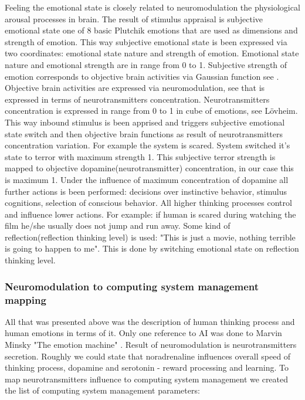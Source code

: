 Feeling the emotional state is closely related to neuromodulation the physiological arousal processes in brain. The result of stimulus appraisal is subjective emotional state one of 8 basic Plutchik emotions that are used as dimensions and strength of emotion. This way subjective emotional state is been expressed via two coordinates: emotional state nature and strength of emotion. Emotional state nature and emotional strength are in range from 0 to 1. Subjective strength of emotion corresponds to objective brain activities via Gaussian function see \cite{hourglass}. Objective brain activities are expressed via neuromodulation, see \cite{emotionsbraintorobot} that is expressed in terms of neurotransmitters concentration. Neurotransmitters  concentration is expressed in range from 0 to 1 in cube of emotions, see Lövheim\cite{cubeofemotions}. This way inbound stimulus is been apprised and triggers subjective emotional state switch and then objective brain functions as result of neurotransmitters concentration variation. For example the system is scared. System switched it's state to terror with maximum strength 1. This subjective terror strength is mapped to objective dopamine(neurotransmitter) concentration, in our case this is maximum 1. Under the influence of maximum concentration of dopamine all further actions is been performed: decisions over instinctive behavior, stimulus cognitions, selection of conscious behavior. All higher thinking processes control and influence lower actions. For example: if human is scared during watching the film he/she usually does not jump and run away. Some kind of reflection(reflection thinking level) is used: "This is just a movie, nothing terrible is going to happen to me". This is done by switching emotional state on reflection thinking level.

\subsubsection{Neuromodulation to computing system management mapping}

All that was presented above was the description of human thinking process and human emotions in terms of it. Only one reference to AI was done to Marvin Minsky "The emotion machine" \cite{emotionmachine}. Result of neuromodulation is neurotransmitters secretion. Roughly we could state that noradrenaline influences overall speed of thinking process, dopamine and serotonin - reward processing and learning. To map neurotransmitters influence to computing system management we created the list of computing system management parameters:

